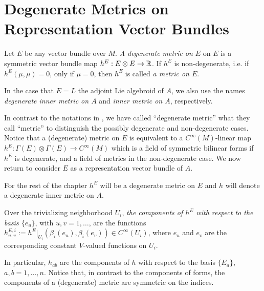 \section{Degenerate Metrics on Representation Vector Bundles}
\label{chIntegrationSectionMetricsRepresentationAssociated}

\begin{definition}
    Let $E$ be any vector bundle over $M$. \emph{A degenerate metric on $E$} on $E$ is a symmetric vector bundle map $h^E: E \otimes E \to \mathbb{R}$. If $h^E$ is non-degenerate, i.e. if $h^E(\mu, \mu) = 0$, only if $\mu = 0$, then $h^E$ is called \emph{a metric on $E$}.
    
    In the case that $E = L$ the adjoint Lie algebroid of $A$, we also use the names \emph{degenerate inner metric on $A$} and \emph{inner metric on $A$}, respectively.
\end{definition}

In contrast to the notations in \cite{Fournel2011, Fournel2013}, we have called ``degenerate metric'' what they call ``metric'' to distinguish the possibly degenerate and non-degenerate cases. Notice that a (degenerate) metric on $E$ is equivalent to a $C^\infty(M)$-linear map $h^E: \Gamma(E) \otimes \Gamma(E) \to C^\infty(M)$ which is a field of symmetric bilinear forms if $h^E$ is degenerate, and a field of metrics in the non-degenerate case. We now return to consider $E$ as a representation vector bundle of $A$.

For the rest of the chapter  $h^E$ will be a degenerate metric on $E$ and $h$ will denote a degenerate inner metric on $A$.

\begin{definition}
    Over the trivializing neighborhood $U_i$, \emph{the components of $h^E$ with respect to the basis $\{e_u\}$}, with $u, v = 1, \dots$, are the functions $h^{E, i}_{u, v}:= h^E|_{U_i}(\beta_i(e_u),\beta_i(e_v)) \in C^\infty(U_i)$, where $e_u$ and $e_v$ are the corresponding constant $V$-valued functions on $U_i$.
\end{definition}

In particular, $h_{ab}$ are the components of $h$ with respect to the basis $\{E_a\}$, $a, b = 1, \dots, n$. Notice that, in contrast to the components of forms, the components of a (degenerate) metric are symmetric on the indices.

